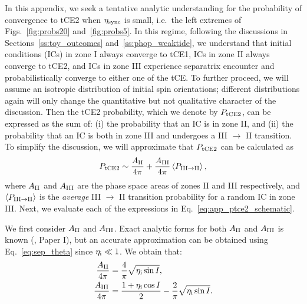 \documentclass[
        fleqn,
        usenatbib,
    ]{mnras}
\newcommand*{\ev}[1]{\left\langle#1\right\rangle}
\begin{document}
In this appendix, we seek a tentative analytic understanding for the
probability of convergence to tCE2 when $\eta_{\rm sync}$ is small, i.e.\ the
left extremes of Figs.~\ref{fig:probs20} and~\ref{fig:probs5}. In this regime,
following the discussions in Sections~\ref{ss:toy_outcomes}
and~\ref{ss:phop_weaktide}, we understand that initial conditions (ICs) in zone I
always converge to tCE1, ICs in zone II always converge to tCE2,
and ICs in zone III experience separatrix encounter and
probabilistically converge to either one of the tCE\@. To further proceed, we
will assume an isotropic distribution of initial spin orientations; different
distributions again will only change the quantitative but not qualitative
character of the discussion. Then the tCE2 probability, which we denote by
$P_{\rm tCE2}$, can be expressed as the sum of: (i) the probability that an IC
is in zone II, and (ii) the probability that an IC is both in zone III and
undergoes a III $\to$ II transition. To simplify the discussion, we will
approximate that $P_{\rm tCE2}$ can be calculated as
\begin{equation}
    P_{\rm tCE2} \sim \frac{A_{\rm II}}{4\pi}
            + \frac{A_{\rm III}}{4\pi}\ev{P_{\rm III \to II}},
            \label{eq:app_ptce2_schematic}
\end{equation}
where $A_{\rm II}$ and $A_{\rm III}$ are the phase space areas of zones II and
III respectively, and $\ev{P_{\rm III \to II}}$ is the \emph{average} III $\to$
II transition probability for a random IC in zone III\@. Next, we evaluate each
of the expressions in Eq.~\eqref{eq:app_ptce2_schematic}.

We first consider $A_{\rm II}$ and $A_{\rm III}$. Exact analytic forms for both
$A_{\rm II}$ and $A_{\rm III}$ is known (\citealp{ward2004I}, Paper I), but an
accurate approximation can be obtained using Eq.~\eqref{eq:sep_theta} since
$\eta_{\rm i} \ll 1$. We obtain that:
\begin{align}
    \frac{A_{\rm II}}{4\pi} &= \frac{4}{\pi}\sqrt{\eta_{\rm i} \sin I},\\
    \frac{A_{\rm III}}{4\pi}
        &= \frac{1 + \eta_{\rm i} \cos I}{2} -
            \frac{2}{\pi}\sqrt{\eta_{\rm i} \sin I}.
\end{align}
\end{document}
